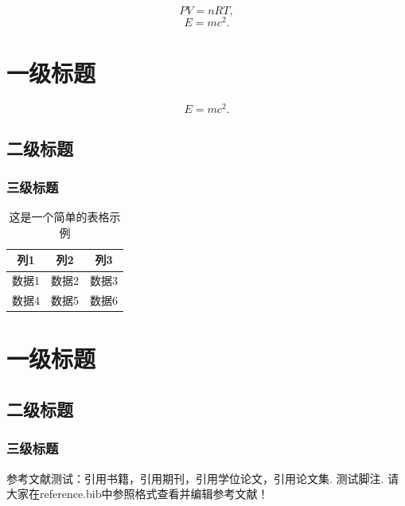 \documentclass[zihao = -4,linespread = 1.38889, heading = true,no-math]{ctexbook} %
\begin{document}
\begin{equation}
  PV = nRT,
\end{equation}
\begin{equation}
  E = mc^2.
\end{equation}


\chapter{一级标题}
\zhlipsum[1]
\begin{equation}
  E = mc^2.
\end{equation}


\section{二级标题}
\zhlipsum[1-3]
\subsection{三级标题}
\zhlipsum[1-3]
\begin{table}
  \centering
  \caption{这是一个简单的表格示例}
  \vspace{0.5em}
  \begin{tabular}{ccc}
    \hline
    \hline
    列1 & 列2 & 列3 \\
    \hline
    数据1 & 数据2 & 数据3 \\
    数据4 & 数据5 & 数据6 \\
    \hline
  \end{tabular}
\end{table}

\chapter{一级标题}
\zhlipsum[1]
\section{二级标题}
\zhlipsum[1-3]
\subsection{三级标题}
\zhlipsum[1-3]

参考文献测试：引用书籍\cite{Guiner1982}，引用期刊\cite{Canvendish1985}，引用学位论文\cite{Cao1993}，引用论文集\cite{Jin1993}. 测试脚注\cite{footnote01}.
请大家在reference.bib中参照格式查看并编辑参考文献！


\printbibgscaep

\begin{acknowledgements}
  \zhlipsum[1] %
\end{acknowledgements}
\end{document}
